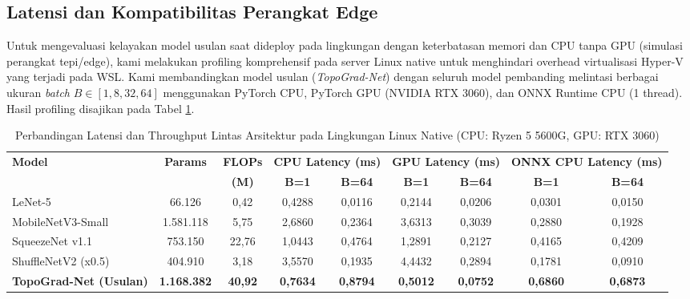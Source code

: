 \documentclass[journal]{IEEEtran}
\begin{document}
\subsection{Latensi dan Kompatibilitas Perangkat Edge}
Untuk mengevaluasi kelayakan model usulan saat dideploy pada lingkungan dengan keterbatasan memori dan CPU tanpa GPU (simulasi perangkat tepi/edge), kami melakukan profiling komprehensif pada server Linux native untuk menghindari overhead virtualisasi Hyper-V yang terjadi pada WSL. Kami membandingkan model usulan (\textit{TopoGrad-Net}) dengan seluruh model pembanding melintasi berbagai ukuran \textit{batch} $B \in [1, 8, 32, 64]$ menggunakan PyTorch CPU, PyTorch GPU (NVIDIA RTX 3060), dan ONNX Runtime CPU (1 thread). Hasil profiling disajikan pada Tabel \ref{tab:edge_profiling}.

\begin{table}[t]
\caption{Perbandingan Latensi dan Throughput Lintas Arsitektur pada Lingkungan Linux Native (CPU: Ryzen 5 5600G, GPU: RTX 3060)}
\label{tab:edge_profiling}
\begin{center}
\footnotesize
\setlength{\tabcolsep}{4pt}
\begin{tabular}{lcccccccc}
\toprule
\textbf{Model} & \textbf{Params} & \textbf{FLOPs} & \multicolumn{2}{c}{\textbf{CPU Latency (ms)}} & \multicolumn{2}{c}{\textbf{GPU Latency (ms)}} & \multicolumn{2}{c}{\textbf{ONNX CPU Latency (ms)}} \\
\cmidrule(lr){4-5} \cmidrule(lr){6-7} \cmidrule(lr){8-9}
& & \textbf{(M)} & \textbf{B=1} & \textbf{B=64} & \textbf{B=1} & \textbf{B=64} & \textbf{B=1} & \textbf{B=64} \\
\midrule
LeNet-5 & 66.126 & 0,42 & 0,4288 & 0,0116 & 0,2144 & 0,0206 & 0,0301 & 0,0150 \\
MobileNetV3-Small & 1.581.118 & 5,75 & 2,6860 & 0,2364 & 3,6313 & 0,3039 & 0,2880 & 0,1928 \\
SqueezeNet v1.1 & 753.150 & 22,76 & 1,0443 & 0,4764 & 1,2891 & 0,2127 & 0,4165 & 0,4209 \\
ShuffleNetV2 (x0.5) & 404.910 & 3,18 & 3,5570 & 0,1935 & 4,4432 & 0,2894 & 0,1781 & 0,0910 \\
\textbf{TopoGrad-Net (Usulan)} & \textbf{1.168.382} & \textbf{40,92} & \textbf{0,7634} & \textbf{0,8794} & \textbf{0,5012} & \textbf{0,0752} & \textbf{0,6860} & \textbf{0,6873} \\
\bottomrule
\end{tabular}
\end{center}
\end{table}
\end{document}
